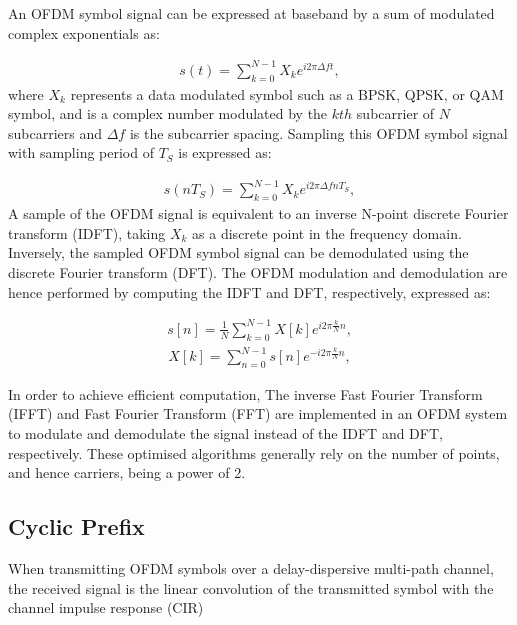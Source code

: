 An OFDM symbol signal can be expressed at baseband by a sum of modulated complex exponentials as:

\begin{eqnarray}
\label{equ:OFDMsignal}
s(t) = \sum_{k=0}^{N-1} X_k e^{i2\pi\Delta ft},
\end{eqnarray}
where $X_{k}$ represents a data modulated symbol such as a BPSK, QPSK, or QAM symbol, and is a complex number modulated by the $kth$ subcarrier of $N$ subcarriers and $\Delta f$ is the subcarrier spacing. 
Sampling this OFDM symbol signal with sampling period of $T_S$ is expressed as:

\begin{eqnarray}
\label{equ:sampledOFDMsignal}
s(nT_S) = \sum_{k=0}^{N-1} X_k e^{i2\pi\Delta fnT_S},
\end{eqnarray}
A sample of the OFDM signal is equivalent to an inverse N-point discrete Fourier transform (IDFT), taking $X_{k}$ as a discrete point in the frequency domain. 
Inversely, the sampled OFDM symbol signal can be demodulated using the discrete Fourier transform (DFT). The OFDM modulation and demodulation are hence performed by computing the IDFT and DFT, respectively, expressed as:

\begin{eqnarray}
\label{equ:sampledOFDMsignal}
s[n] = \frac{1}{N}\sum_{k=0}^{N-1} X[k] e^{i2\pi\frac{k}{N}n},
\end{eqnarray} 
\begin{eqnarray}
\label{equ:sampledOFDMsignal}
X[k] = \sum_{n=0}^{N-1} s[n] e^{-i2\pi\frac{k}{N}n},
\end{eqnarray} 

In order to achieve efficient computation, The inverse Fast Fourier Transform (IFFT) and Fast Fourier Transform (FFT) are implemented in an OFDM system to modulate and demodulate the signal instead of the IDFT and DFT, respectively. These optimised algorithms generally rely on the number of points, and hence carriers, being a power of 2.

\subsection{Cyclic Prefix}

When transmitting OFDM symbols over a delay-dispersive multi-path channel, the received signal is the linear convolution of the transmitted symbol with the channel impulse
response (CIR) 

